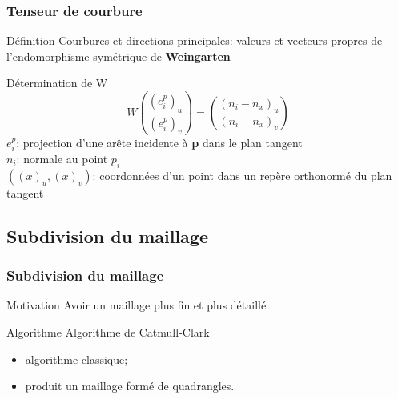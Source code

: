 \documentclass[9pt]{beamer}
\begin{document}
\begin{frame}
	\frametitle{Tenseur de courbure}
	
	\begin{block}{Définition}
		Courbures et directions principales: valeurs et vecteurs propres de l'endomorphisme symétrique de
		\textbf{Weingarten}
	\end{block}
	
	\begin{block}{Détermination de W}
		\begin{equation*}
			W{(e_i^p)_u \choose (e_i^p)_v} = {(n_i - n_x)_u \choose (n_i - n_x)_v}
		\end{equation*}
		$e_i^p$: projection d'une arête incidente à \textbf{p} dans le plan tangent \\
		$n_i$: normale au point $p_i$ \\
		$((x)_u, (x)_v)$: coordonnées d'un point dans un repère orthonormé du plan tangent
	\end{block}
\end{frame}


\subsection{Subdivision du maillage}
\begin{frame}
	\frametitle{Subdivision du maillage}
	
	\begin{block}{Motivation}
		Avoir un maillage plus fin et plus détaillé
	\end{block}
	
	\begin{block}{Algorithme}
		Algorithme de Catmull-Clark
		\begin{itemize}
			\item algorithme classique;
			\item produit un maillage formé de quadrangles.
		\end{itemize}
	\end{block}
\end{frame}
\end{document}
